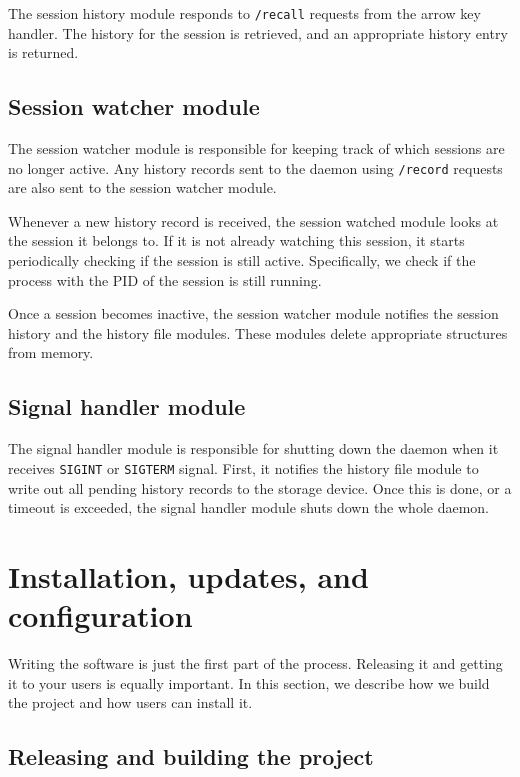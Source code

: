 The session history module responds to \verb|/recall| requests from the arrow key handler. The history for the session is retrieved, and an appropriate history entry is returned. 

\subsection{Session watcher module}

The session watcher module is responsible for keeping track of which sessions are no longer active. Any history records sent to the daemon using \verb|/record| requests are also sent to the session watcher module. 

Whenever a new history record is received, the session watched module looks at the session it belongs to. If it is not already watching this session, it starts periodically checking if the session is still active. Specifically, we check if the process with the PID of the session is still running.

Once a session becomes inactive, the session watcher module notifies the session history and the history file modules. These modules delete appropriate structures from memory.

\subsection{Signal handler module}

The signal handler module is responsible for shutting down the daemon when it receives \verb|SIGINT| or \verb|SIGTERM| signal. First, it notifies the history file module to write out all pending history records to the storage device. Once this is done, or a timeout is exceeded, the signal handler module shuts down the whole daemon.


\section{Installation, updates, and configuration}

Writing the software is just the first part of the process. Releasing it and getting it to your users is equally important. In this section, we describe how we build the project and how users can install it.

\subsection{Releasing and building the project}

